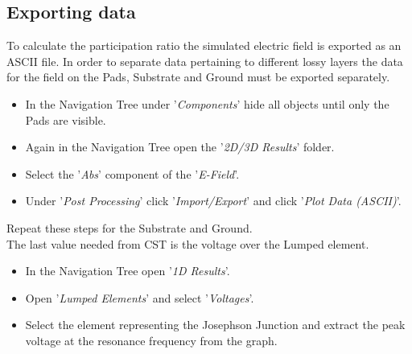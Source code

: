 \subsection{Exporting data}
To calculate the participation ratio the simulated electric field is exported as an ASCII file. In order to separate data pertaining to different lossy layers the data for the field on the Pads, Substrate and Ground must be exported separately. 
\begin{itemize}
	\item In the Navigation Tree under '\textit{Components}' hide all objects until only the Pads are visible.
	\item Again in the Navigation Tree open the '\textit{2D/3D Results}' folder.
	\item Select the '\textit{Abs}' component of the '\textit{E-Field}'.
	\item Under '\textit{Post Processing}' click '\textit{Import/Export}' and click '\textit{Plot Data (ASCII)}'. 
\end{itemize}
Repeat these steps for the Substrate and Ground. \\
The last value needed from CST is the voltage over the Lumped element.
\begin{itemize}
	\item In the Navigation Tree open '\textit{1D Results}'.
	\item Open '\textit{Lumped Elements}' and select '\textit{Voltages}'.
	\item Select the element representing the Josephson Junction and extract the peak voltage at the resonance frequency from the graph.   
\end{itemize}

